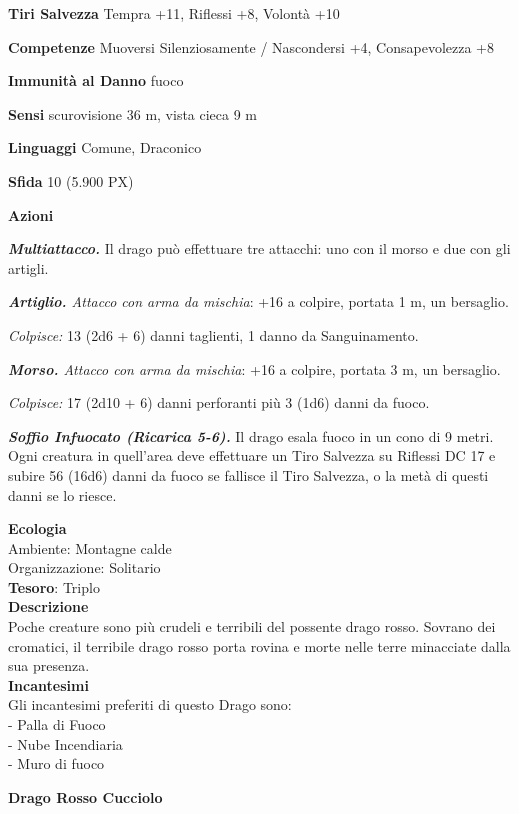 \begin{multicols}{2}
	\textbf{Tiri Salvezza} Tempra +11, Riflessi +8, Volontà +10

	\textbf{Competenze} Muoversi Silenziosamente / Nascondersi +4, Consapevolezza +8

	\textbf{Immunità al Danno} fuoco

	\textbf{Sensi} scurovisione 36 m, vista cieca 9 m

	\textbf{Linguaggi} Comune, Draconico

	\textbf{Sfida} 10 (5.900 PX)

	\textbf{Azioni}

	\textit{\textbf{Multiattacco.}} Il drago può effettuare tre attacchi: uno con il morso e due con gli artigli.

	\textit{\textbf{Artiglio.} Attacco con arma da mischia}: +16 a colpire, portata 1 m, un bersaglio.

	\textit{Colpisce:} 13 (2d6 + 6) danni taglienti, 1 danno da Sanguinamento.

	\textit{\textbf{Morso.} Attacco con arma da mischia}: +16 a colpire, portata 3 m, un bersaglio.

	\textit{Colpisce:} 17 (2d10 + 6) danni perforanti più 3 (1d6) danni da fuoco.

	\textit{\textbf{Soffio Infuocato (Ricarica 5-6).}} Il drago esala fuoco in un cono di 9 metri. Ogni creatura in quell'area deve effettuare un Tiro Salvezza su Riflessi DC 17 e subire 56 (16d6) danni da fuoco se fallisce il Tiro Salvezza, o la metà di questi danni se lo riesce.

	\textbf{Ecologia}\\
	Ambiente: Montagne calde\\
	Organizzazione: Solitario\\
	\textbf{Tesoro}: Triplo\\
	\textbf{Descrizione}\\
	Poche creature sono più crudeli e terribili del possente drago rosso. Sovrano dei cromatici, il terribile drago rosso porta rovina e morte nelle terre minacciate dalla sua presenza.\\
	\textbf{Incantesimi}\\
	Gli incantesimi preferiti di questo Drago sono:\\
	- Palla di Fuoco\\
	- Nube Incendiaria\\
	- Muro di fuoco


	\medskip{}\textbf{Drago Rosso Cucciolo}


\end{multicols}
